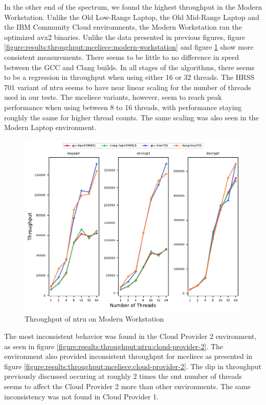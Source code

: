 In the other end of the spectrum, we found the highest throughput in the Modern Workstation. Unlike the Old Low-Range Laptop, the Old Mid-Range Laptop and the IBM Community Cloud environments, the Modern Workstation ran the optimized \gls{avx2} binaries. Unlike the data presented in previous figures, figure \ref{figure:results:throughput:mceliece:modern-workstation} and figure \ref{figure:results:throughput:ntru:modern-workstation} show more consistent measurements. There seems to be little to no difference in speed between the GCC and Clang builds. In all stages of the algorithms, there seems to be a regression in throughput when using either 16 or 32 threads. The HRSS 701 variant of \gls{ntru} seems to have near linear scaling for the number of threads used in our tests. The \gls{mceliece} variants, however, seem to reach peak performance when using between 8 to 16 threads, with performance staying roughly the same for higher thread counts. The same scaling was also seen in the Modern Laptop environment.

\begin{figure}
    \centering
    \includegraphics[scale=0.75]{chapters/results/throughput/Modern Workstation_ntru.pdf}
    \caption{Throughput of \gls{ntru} on Modern Workstation}
    \label{figure:results:throughput:ntru:modern-workstation}
\end{figure}

The most inconsistent behavior was found in the Cloud Provider 2 environment, as seen in figure \ref{figure:results:throughput:ntru:cloud-provider-2}. The environment also provided inconsistent throughput for \gls{mceliece} as presented in figure \ref{figure:results:throughput:mceliece:cloud-provider-2}. The dip in throughput previously discussed occuring at roughly 2 times the \gls{smt} number of threads seems to affect the Cloud Provider 2 more than other environments. The same inconsistency was not found in Cloud Provider 1.

